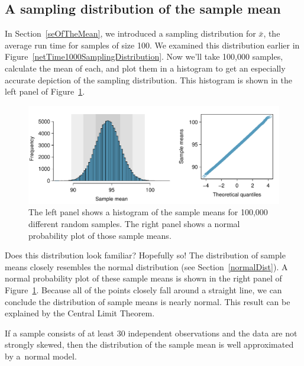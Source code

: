 \subsection{A sampling distribution of the sample mean}
\label{sectionSamplingDistributionOfTheSampleMean}

In Section~\ref{seOfTheMean}, we introduced a sampling distribution for $\bar{x}$, the average run time for samples of size 100. We examined this distribution earlier in Figure~\ref{netTime1000SamplingDistribution}. Now we'll take 100,000 samples, calculate the mean of each, and plot them in a histogram to get an especially accurate depiction of the sampling distribution. This histogram is shown in the left panel of Figure~\ref{netTimeBigSamplingDistribution}.

\begin{figure}[hht]
   \centering
   \includegraphics[width=\textwidth]{04/figures/netTimeBigSamplingDistribution/netTimeBigSamplingDistribution}
   \caption{The left panel shows a histogram of the sample means for 100,000 different random samples. The right panel shows a normal probability plot of those sample means.}
   \label{netTimeBigSamplingDistribution}
\end{figure}

Does this distribution look familiar? Hopefully so! The distribution of sample means closely resembles the normal distribution (see Section~\ref{normalDist}). A normal probability plot of these sample means is shown in the right panel of Figure~\ref{netTimeBigSamplingDistribution}. Because all of the points closely fall around a straight line, we can conclude the distribution of sample means is nearly normal. This result can be explained by the Central Limit Theorem.

\begin{termBox}{
If a sample consists of at least 30 independent observations and the data are not strongly skewed, then the distribution of the sample mean is well approximated by a~normal model.}
\end{termBox}

